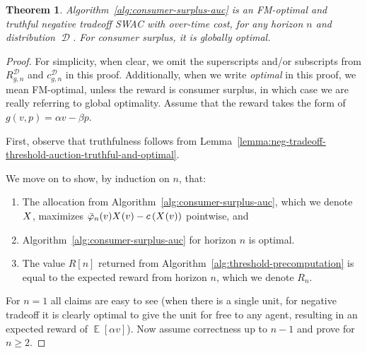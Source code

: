 \documentclass[11pt,letterpaper]{article}
\newcommand{\sqbr}[1]{\left[ #1 \right]}
\newcommand{\brackets}[1]{\left( #1 \right)}
\newcommand{\swac}{SWAC\xspace}
\DeclareMathOperator*{\E}{\bb{E}}
\newcommand{\bb}[1]{\mathbb{#1}}
\DeclareMathOperator{\D}{\mathcal{D}}
\newcommand{\g}{g}
\newcommand{\irn}{\Bar{\varphi}}
\theoremstyle{plain}
\newtheorem{theorem}{Theorem}[section]
\begin{document}
\begin{theorem}\label{theorem:threshold-mech}
    Algorithm~\ref{alg:consumer-surplus-auc} is an FM-optimal and truthful negative tradeoff \swac with over-time cost, for any horizon $n$ and distribution $\D$. For consumer surplus, it is globally optimal.
\end{theorem}
\begin{proof} For simplicity, when clear, we omit the superscripts and/or subscripts from $R_{\g,n}^{\D}$ and $c_{\g,n}^{\D}$ in this proof. Additionally, when we write \emph{optimal} in this proof, we mean FM-optimal, unless the reward is consumer surplus, in which case we are really referring to global optimality. Assume that the reward takes the form of $\g(v,p)=\alpha v-\beta p$.

First, observe that truthfulness follows from Lemma~\ref{lemma:neg-tradeoff-threshold-auction-truthful-and-optimal}.

    We move on to show, by induction on $n$, that:
    \begin{enumerate}
        \item The allocation from Algorithm~\ref{alg:consumer-surplus-auc}, which we denote $\alloc$, maximizes $\irn_n(v)\x{v}-c\brackets{\x{v}}$ pointwise, and\label{item:1_consumer_surplus}
        \item  Algorithm~\ref{alg:consumer-surplus-auc} for horizon $n$ is optimal.\label{item:2_consumer_surplus}
        \item The value $R[n]$ returned from Algorithm~\ref{alg:threshold-precomputation} is equal to the expected reward from horizon $n$, which we denote $R_n$.
    \end{enumerate}

     For $n=1$ all claims are easy to see (when there is a single unit, for negative tradeoff it is clearly optimal to give the unit for free to any agent, resulting in an expected reward of $\E[\alpha v]$). Now assume correctness up to $n-1$ and prove for $n\geq2$. 





\end{proof}
\end{document}
